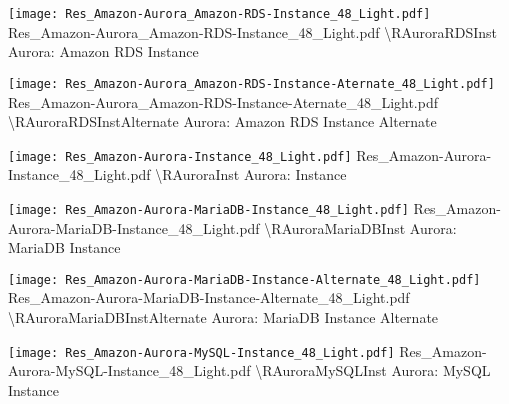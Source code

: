  {\texttt{[image: Res\_Amazon-Aurora\_Amazon-RDS-Instance\_48\_Light.pdf]}} {Res\_Amazon-Aurora\_Amazon-RDS-Instance\_48\_Light.pdf} {{\textbackslash}RAuroraRDSInst} {Aurora: Amazon RDS Instance}

 {\texttt{[image: Res\_Amazon-Aurora\_Amazon-RDS-Instance-Aternate\_48\_Light.pdf]}} {Res\_Amazon-Aurora\_Amazon-RDS-Instance-Aternate\_48\_Light.pdf} {{\textbackslash}RAuroraRDSInstAlternate} {Aurora: Amazon RDS Instance Alternate}

 {\texttt{[image: Res\_Amazon-Aurora-Instance\_48\_Light.pdf]}} {Res\_Amazon-Aurora-Instance\_48\_Light.pdf} {{\textbackslash}RAuroraInst} {Aurora: Instance}

 {\texttt{[image: Res\_Amazon-Aurora-MariaDB-Instance\_48\_Light.pdf]}} {Res\_Amazon-Aurora-MariaDB-Instance\_48\_Light.pdf} {{\textbackslash}RAuroraMariaDBInst} {Aurora: MariaDB Instance}

 {\texttt{[image: Res\_Amazon-Aurora-MariaDB-Instance-Alternate\_48\_Light.pdf]}} {Res\_Amazon-Aurora-MariaDB-Instance-Alternate\_48\_Light.pdf} {{\textbackslash}RAuroraMariaDBInstAlternate} {Aurora: MariaDB Instance Alternate}

 {\texttt{[image: Res\_Amazon-Aurora-MySQL-Instance\_48\_Light.pdf]}} {Res\_Amazon-Aurora-MySQL-Instance\_48\_Light.pdf} {{\textbackslash}RAuroraMySQLInst} {Aurora: MySQL Instance}

